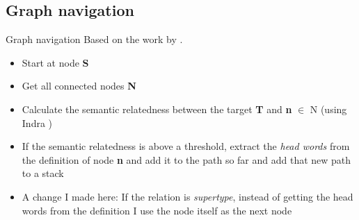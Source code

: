 \documentclass{beamer}
\begin{document}

\subsection{Graph navigation}
\begin{frame}{Graph navigation}
Based on the work by \cite{silva2018recognizing}.
\begin{itemize}
    \item Start at node \textbf{S}
    \item Get all connected nodes \textbf{N}
    \item Calculate the semantic relatedness between the target \textbf{T} and \textbf{n} $\in$ N (using Indra \cite{indra2018})
    \item If the semantic relatedness is above a threshold, extract the \textit{head words} from the definition of node \textbf{n} and add it to the path so far and add that new path to a stack
    \item A change I made here: If the relation is \textit{supertype}, instead of getting the head words from the definition I use the node itself as the next node

\end{itemize}
\end{frame}
\end{document}
